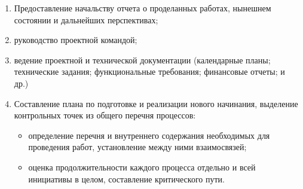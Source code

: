 \documentclass{../industrial-development}
\begin{document}
\begin{enumerate}
\item Предоставление начальству отчета о проделанных работах, нынешнем состоянии и дальнейших перспективах; 
\item руководство проектной командой; 
\item ведение проектной и технической документации (календарные планы; технические задания; функциональные требования; финансовые отчеты; и др.) 
\item Составление плана по подготовке и реализации нового начинания, выделение контрольных точек из общего перечня процессов: 
\begin{itemize} 
\item определение перечня и внутреннего содержания необходимых для проведения работ, установление между ними взаимосвязей; 
\item оценка продолжительности каждого процесса отдельно и всей инициативы в целом, составление критического пути. 
\end{itemize} 
\end{enumerate}
\end{document}
